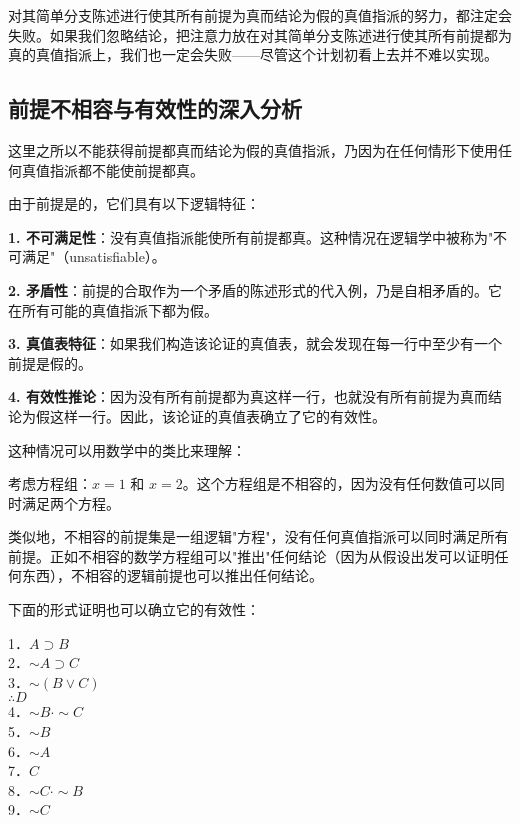 对其简单分支陈述进行使其所有前提为真而结论为假的真值指派的努力，都注定会失败。如果我们忽略结论，把注意力放在对其简单分支陈述进行使其所有前提都为真的真值指派上，我们也一定会失败——尽管这个计划初看上去并不难以实现。

\subsection{前提不相容与有效性的深入分析}

这里之所以不能获得前提都真而结论为假的真值指派，乃因为在任何情形下使用任何真值指派都不能使前提都真。

\begin{theorembox}[title=不相容前提的逻辑特征]
由于前提是的，它们具有以下逻辑特征：

\textbf{1. 不可满足性}：没有真值指派能使所有前提都真。这种情况在逻辑学中被称为"不可满足"（unsatisfiable）。

\textbf{2. 矛盾性}：前提的合取作为一个矛盾的陈述形式的代入例，乃是自相矛盾的。它在所有可能的真值指派下都为假。

\textbf{3. 真值表特征}：如果我们构造该论证的真值表，就会发现在每一行中至少有一个前提是假的。

\textbf{4. 有效性推论}：因为没有所有前提都为真这样一行，也就没有所有前提为真而结论为假这样一行。因此，该论证的真值表确立了它的有效性。
\end{theorembox}

\begin{examplebox}[title=不相容前提的数学类比]
这种情况可以用数学中的类比来理解：

考虑方程组：$x = 1$ 和 $x = 2$。这个方程组是不相容的，因为没有任何数值可以同时满足两个方程。

类似地，不相容的前提集是一组逻辑"方程"，没有任何真值指派可以同时满足所有前提。正如不相容的数学方程组可以"推出"任何结论（因为从假设出发可以证明任何东西），不相容的逻辑前提也可以推出任何结论。
\end{examplebox}

下面的形式证明也可以确立它的有效性：

1．$A \supset B$\\
2．$\sim A \supset C$\\
3．$\sim(B \vee C)$\\
$\therefore D$\\
4．$\sim B \cdot \sim C$\\
5．$\sim B$\\
6．$\sim A$\\
7．$C$\\
8．$\sim C \cdot \sim B$\\
9．$\sim C$

